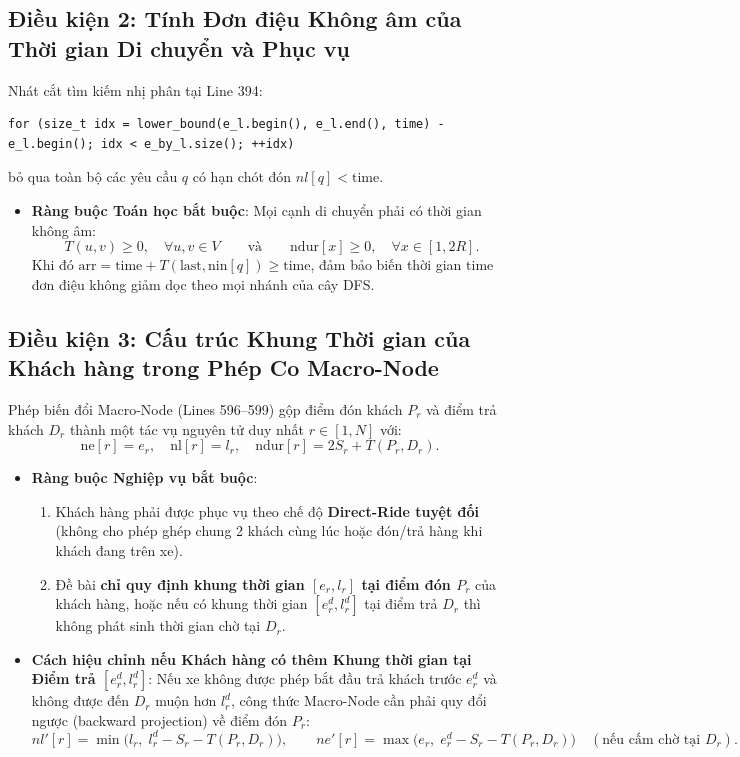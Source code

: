 \documentclass[11pt,a4paper]{article}
\theoremstyle{definition}
\begin{document}
\subsection{Điều kiện 2: Tính Đơn điệu Không âm của Thời gian Di chuyển và Phục vụ}
Nhát cắt tìm kiếm nhị phân tại Line 394:
\begin{lstlisting}
for (size_t idx = lower_bound(e_l.begin(), e_l.end(), time) - e_l.begin(); idx < e_by_l.size(); ++idx)
\end{lstlisting}
bỏ qua toàn bộ các yêu cầu $q$ có hạn chót đón $nl[q] < \text{time}$.
\begin{itemize}[leftmargin=1.5em]
    \item \textbf{Ràng buộc Toán học bắt buộc}: Mọi cạnh di chuyển phải có thời gian không âm:
    \begin{equation}
        T(u, v) \ge 0, \quad \forall u, v \in V \qquad \text{và} \qquad \text{ndur}[x] \ge 0, \quad \forall x \in [1, 2R].
    \end{equation}
    Khi đó $\text{arr} = \text{time} + T(\text{last}, \text{nin}[q]) \ge \text{time}$, đảm bảo biến thời gian $\text{time}$ đơn điệu không giảm dọc theo mọi nhánh của cây DFS.
\end{itemize}

\subsection{Điều kiện 3: Cấu trúc Khung Thời gian của Khách hàng trong Phép Co Macro-Node}
Phép biến đổi Macro-Node (Lines 596--599) gộp điểm đón khách $P_r$ và điểm trả khách $D_r$ thành một tác vụ nguyên tử duy nhất $r \in [1, N]$ với:
\[
    \text{ne}[r] = e_r, \quad \text{nl}[r] = l_r, \quad \text{ndur}[r] = 2S_r + T(P_r, D_r).
\]
\begin{itemize}[leftmargin=1.5em]
    \item \textbf{Ràng buộc Nghiệp vụ bắt buộc}:
    \begin{enumerate}[label=(3\alph*)]
        \item Khách hàng phải được phục vụ theo chế độ \textbf{Direct-Ride tuyệt đối} (không cho phép ghép chung 2 khách cùng lúc hoặc đón/trả hàng khi khách đang trên xe).
        \item Đề bài \textbf{chỉ quy định khung thời gian $[e_r, l_r]$ tại điểm đón $P_r$} của khách hàng, hoặc nếu có khung thời gian $[e^d_r, l^d_r]$ tại điểm trả $D_r$ thì không phát sinh thời gian chờ tại $D_r$.
    \end{enumerate}
    \item \textbf{Cách hiệu chỉnh nếu Khách hàng có thêm Khung thời gian tại Điểm trả $[e^d_r, l^d_r]$}:
    Nếu xe không được phép bắt đầu trả khách trước $e^d_r$ và không được đến $D_r$ muộn hơn $l^d_r$, công thức Macro-Node cần phải quy đổi ngược (backward projection) về điểm đón $P_r$:
    \[
        nl'[r] = \min\Big(l_r, \; l^d_r - S_r - T(P_r, D_r)\Big), \qquad ne'[r] = \max\Big(e_r, \; e^d_r - S_r - T(P_r, D_r)\Big) \quad (\text{nếu cấm chờ tại } D_r).
    \]
\end{itemize}
\end{document}
